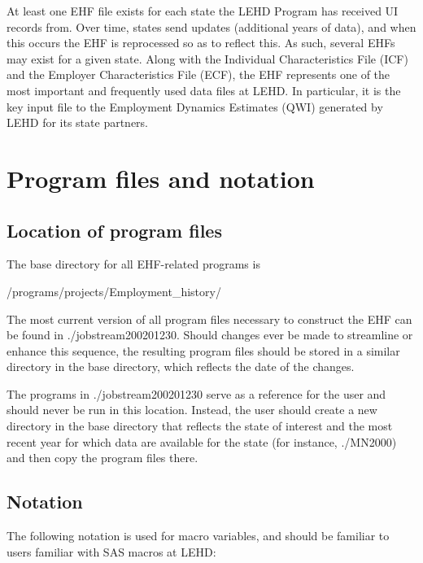 At least one EHF file exists for each state the LEHD Program has
received UI records from. Over time, states send updates
(additional years of data), and when this occurs the EHF is reprocessed so
as to reflect this. As such, several EHFs may exist for a given state.
Along with the Individual Characteristics File (ICF) and the Employer
Characteristics File (ECF), the EHF represents one of the most important
and frequently used data files at LEHD. In particular, it is the key input
file to the Employment Dynamics Estimates (QWI) generated by LEHD for its
state partners.





\section{Program files and notation\label{sec:ehf_technical_location}}


\subsection*{Location of program files}


The base directory for all EHF-related programs is 
\begin{center}
/programs/projects/Employment{\_}history/
\end{center}


The most current version of all program files necessary to construct the EHF 
can be found in ./jobstream200201230.   
Should changes ever be made to streamline or enhance this sequence, the 
resulting program files should be stored in a similar directory in 
the base directory, which reflects the date of the 
changes. 

The programs in ./jobstream200201230 
serve as a reference for the user and should never be run in this location. 
Instead, the user should create a new directory in 
the base directory that reflects the state of interest 
and the most recent year for which data are available for the state (for 
instance, ./MN2000) and then copy the program files there.



\subsection*{Notation}

The following notation is used for macro variables, and should be familiar
to users familiar with SAS macros at LEHD:


